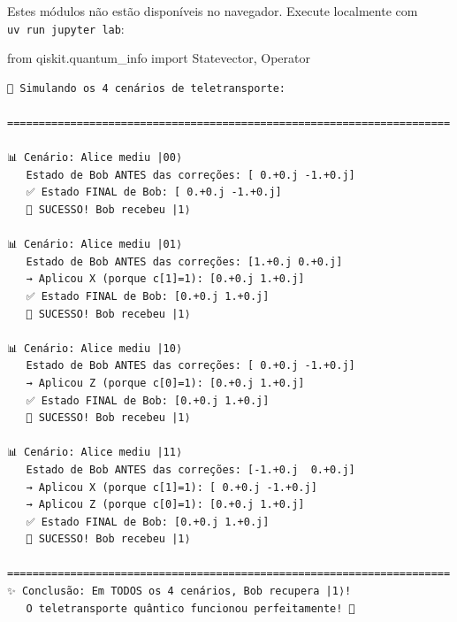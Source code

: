 \documentclass[
  brazilian,
]{report}
\newenvironment{Shaded}{\begin{snugshade}}{\end{snugshade}}
\newcommand{\ImportTok}[1]{\textcolor[rgb]{0.00,0.46,0.62}{#1}}
\newcommand{\NormalTok}[1]{\textcolor[rgb]{0.00,0.23,0.31}{#1}}
\begin{document}
\begin{tcolorbox}[enhanced jigsaw, arc=.35mm, bottomrule=.15mm, bottomtitle=1mm, breakable, colback=white, colbacktitle=quarto-callout-note-color!10!white, colframe=quarto-callout-note-color-frame, coltitle=black, left=2mm, leftrule=.75mm, opacityback=0, opacitybacktitle=0.6, rightrule=.15mm, title=\textcolor{quarto-callout-note-color}{\faInfo}\hspace{0.5em}{🔒 Imports do Qiskit (requerem execução local)}, titlerule=0mm, toprule=.15mm, toptitle=1mm]

Estes módulos não estão disponíveis no navegador. Execute localmente com
\texttt{uv\ run\ jupyter\ lab}:

\begin{Shaded}
\begin{Highlighting}[]
\ImportTok{from}\NormalTok{ qiskit.quantum\_info }\ImportTok{import}\NormalTok{ Statevector, Operator}
\end{Highlighting}
\end{Shaded}

\end{tcolorbox}

\begin{verbatim}
🔬 Simulando os 4 cenários de teletransporte:

======================================================================

📊 Cenário: Alice mediu |00⟩
   Estado de Bob ANTES das correções: [ 0.+0.j -1.+0.j]
   ✅ Estado FINAL de Bob: [ 0.+0.j -1.+0.j]
   🎉 SUCESSO! Bob recebeu |1⟩

📊 Cenário: Alice mediu |01⟩
   Estado de Bob ANTES das correções: [1.+0.j 0.+0.j]
   → Aplicou X (porque c[1]=1): [0.+0.j 1.+0.j]
   ✅ Estado FINAL de Bob: [0.+0.j 1.+0.j]
   🎉 SUCESSO! Bob recebeu |1⟩

📊 Cenário: Alice mediu |10⟩
   Estado de Bob ANTES das correções: [ 0.+0.j -1.+0.j]
   → Aplicou Z (porque c[0]=1): [0.+0.j 1.+0.j]
   ✅ Estado FINAL de Bob: [0.+0.j 1.+0.j]
   🎉 SUCESSO! Bob recebeu |1⟩

📊 Cenário: Alice mediu |11⟩
   Estado de Bob ANTES das correções: [-1.+0.j  0.+0.j]
   → Aplicou X (porque c[1]=1): [ 0.+0.j -1.+0.j]
   → Aplicou Z (porque c[0]=1): [0.+0.j 1.+0.j]
   ✅ Estado FINAL de Bob: [0.+0.j 1.+0.j]
   🎉 SUCESSO! Bob recebeu |1⟩

======================================================================
✨ Conclusão: Em TODOS os 4 cenários, Bob recupera |1⟩!
   O teletransporte quântico funcionou perfeitamente! 🚀
\end{verbatim}
\end{document}
